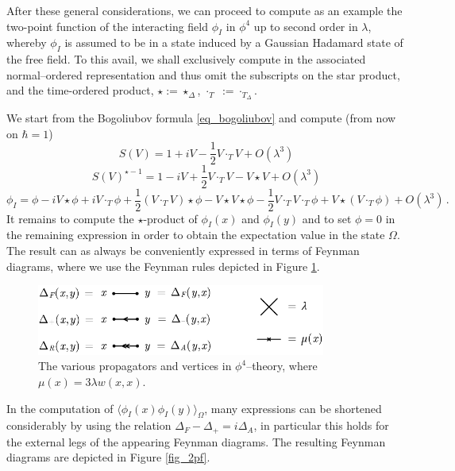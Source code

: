\documentclass[a4paper,10pt,twoside]{article}
\numberwithin{equation}{section}
\newcounter{and}
\theoremstyle{plain}
\theoremstyle{definition}
\begin{document}
After these general considerations, we can proceed to compute as an example the two-point function of the interacting field $\phi_I$ in $\phi^4$ up to second order in $\lambda$, whereby $\phi_I$ is assumed to be in a state induced by a Gaussian Hadamard state of the free field. To this avail, we shall exclusively compute in the associated normal--ordered representation and thus omit the subscripts on the star product, and the time-ordered product, $\star:=\star_\Delta$, $\cdot_T\;:=\cdot_{T_\Delta}$.


We start from the Bogoliubov formula \eqref{eq_bogoliubov} and compute (from now on $\hbar=1$)
$$
S(V)=1+iV-\frac12 V\cdot_T V + O(\lambda^3)
$$
$$
S(V)^{\star -1}=1-iV+\frac12 V\cdot_T V-V\star V + O(\lambda^3)
$$
$$
\phi_I=\phi-i V\star \phi+i V\cdot_T\phi+\frac12\left( V\cdot_T V\right)\star \phi-V\star V\star\phi-\frac12 V\cdot_T V\cdot_T \phi+V\star(V\cdot_T\phi)+O(\lambda^3)\,.
$$
It remains to compute the $\star$-product of $\phi_I(x)$ and $\phi_I(y)$ and to set $\phi=0$ in the remaining expression in order to obtain the expectation value in the state $\Omega$. The result can as always be conveniently expressed in terms of Feynman diagrams, where we use the Feynman rules depicted in Figure \ref{fig_propagators}.

\begin{figure}[!htb]\begin{center}
\includegraphics[width=9.5cm]{fig_propagators}
\end{center}
\caption{\label{fig_propagators}The various propagators and vertices in $\phi^4$--theory, where $\mu(x)=3\lambda w(x,x)$.}
\end{figure}

 In the computation of $\langle\phi_I(x)\phi_I(y)\rangle_\Omega$, many expressions can be shortened considerably by using the relation $\Delta_F-\Delta_+=i\Delta_A$, in particular this holds for the external legs of the appearing Feynman diagrams. The resulting Feynman diagrams are depicted in Figure \ref{fig_2pf}.
\end{document}
